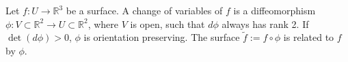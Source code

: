 Let $f: U \to \mathbb{R}^3$ be a surface. A change of variables of $f$ is a diffeomorphism $\phi: V \subset \mathbb{R}^2 \to U \subset \mathbb{R}^2$, where $V$ is open, such that $d\phi$ always has rank 2. If $\det(d\phi) > 0$, $\phi$ is orientation preserving. The surface $\tilde{f} := f \circ \phi$ is related to $f$ by $\phi$.